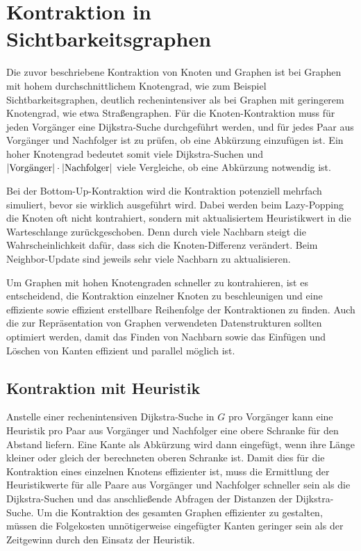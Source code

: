 \chapter{Kontraktion in Sichtbarkeitsgraphen}\label{chapter:kontraktion}

Die zuvor beschriebene Kontraktion von Knoten und Graphen ist bei Graphen mit hohem durchschnittlichem Knotengrad, wie zum Beispiel Sichtbarkeitsgraphen, deutlich rechenintensiver als bei Graphen mit geringerem Knotengrad, wie etwa Straßengraphen.
Für die Knoten-Kontraktion muss für jeden Vorgänger eine Dijkstra-Suche durchgeführt werden, und für jedes Paar aus Vorgänger und Nachfolger ist zu prüfen, ob eine Abkürzung einzufügen ist.
Ein hoher Knotengrad bedeutet somit viele Dijkstra-Suchen und $\abs{\text{Vorgänger}} \cdot \abs{\text{Nachfolger}}$ viele Vergleiche, ob eine Abkürzung notwendig ist.

Bei der Bottom-Up-Kontraktion wird die Kontraktion potenziell mehrfach simuliert, bevor sie wirklich ausgeführt wird.
Dabei werden beim Lazy-Popping die Knoten oft nicht kontrahiert, sondern mit aktualisiertem Heuristikwert in die Warteschlange zurückgeschoben.
Denn durch viele Nachbarn steigt die Wahrscheinlichkeit dafür, dass sich die Knoten-Differenz verändert.
Beim Neighbor-Update sind jeweils sehr viele Nachbarn zu aktualisieren.

Um Graphen mit hohen Knotengraden schneller zu kontrahieren, ist es entscheidend, die Kontraktion einzelner Knoten zu beschleunigen und eine effiziente sowie effizient erstellbare Reihenfolge der Kontraktionen zu finden.
Auch die zur Repräsentation von Graphen verwendeten Datenstrukturen sollten optimiert werden, damit das Finden von Nachbarn sowie das Einfügen und Löschen von Kanten effizient und parallel möglich ist.

\section{Kontraktion mit Heuristik}

Anstelle einer rechenintensiven Dijkstra-Suche in $G$ pro Vorgänger kann eine Heuristik pro Paar aus Vorgänger und Nachfolger eine obere Schranke für den Abstand liefern.
Eine Kante als Abkürzung wird dann eingefügt, wenn ihre Länge kleiner oder gleich der berechneten oberen Schranke ist.
Damit dies für die Kontraktion eines einzelnen Knotens effizienter ist, muss die Ermittlung der Heuristikwerte für alle Paare aus Vorgänger und Nachfolger schneller sein als die Dijkstra-Suchen und das anschließende Abfragen der Distanzen der Dijkstra-Suche.
Um die Kontraktion des gesamten Graphen effizienter zu gestalten, müssen die Folgekosten unnötigerweise eingefügter Kanten geringer sein als der Zeitgewinn durch den Einsatz der Heuristik.

